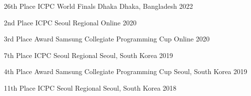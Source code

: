 



\begin{cvhonors}

  \cvhonor
    {26th Place} %
    {ICPC World Finals Dhaka} %
    {Dhaka, Bangladesh} %
    {2022} %

\end{cvhonors}




\begin{cvhonors}

  \cvhonor
    {2nd Place} %
    {ICPC Seoul Regional} %
    {Online} %
    {2020} %

  \cvhonor
    {3rd Place Award} %
    {Samsung Collegiate Programming Cup} %
    {Online} %
    {2020} %

  \cvhonor
    {7th Place} %
    {ICPC Seoul Regional} %
    {Seoul, South Korea} %
    {2019} %
    
  \cvhonor
    {4th Place Award} %
    {Samsung Collegiate Programming Cup} %
    {Seoul, South Korea} %
    {2019} %

  \cvhonor
    {11th Place} %
    {ICPC Seoul Regional} %
    {Seoul, South Korea} %
    {2018} %

\end{cvhonors}

